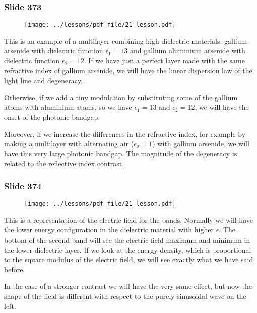 \documentclass[../main/main.tex]{subfiles}
\begin{document}
\subsubsection{Slide 373}

\begin{figure}[h!]
\centering
\texttt{[image: ../lessons/pdf\_file/21\_lesson.pdf]}
\end{figure}

This is an example of a multilayer combining high dielectric materials: gallium arsenide with dielectric function $\epsilon_1 = 13$ and gallium aluminium arsenide with dielectric function $\epsilon_2 = 12$.
If we have just a perfect layer made with the same refractive index of gallium arsenide, we will have the linear dispersion law of the light line and degeneracy. 

Otherwise, if we add a tiny modulation by substituting some of the gallium atoms with aluminium atoms, so we have $\epsilon_1 = 13$ and $\epsilon_2 = 12$, we will have the onset of the photonic bandgap.

Moreover, if we increase the differences in the refractive index, for example by making a multilayer with alternating air ($\epsilon_2 = 1$) with gallium arsenide, we will have this very large photonic bandgap.
The magnitude of the degeneracy is related to the reflective index contrast.


\newpage

\subsubsection{Slide 374}

\begin{figure}[h!]
\centering
\texttt{[image: ../lessons/pdf\_file/21\_lesson.pdf]}
\end{figure}

This is a representation of the electric field for the bands.
Normally we will have the lower energy configuration in the dielectric material with higher $\epsilon$. 
The bottom of the second band will see the electric field maximum and minimum in the lower dielectric layer.
If we look at the energy density, which is proportional to the square modulus of the electric field, we will see exactly what we have said before.

In the case of a stronger contrast we will have the very same effect, but now the shape of the field is different with respect to the purely sinusoidal wave on the left.
\end{document}
